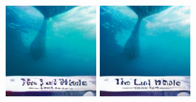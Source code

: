 \begin{figure}[h]
\begin{minipage}{0.15\textwidth}
    \end{minipage}
    \begin{minipage}{0.15\textwidth}
        \centering
        \includegraphics[width=\linewidth]{material/1k/2.png}
    \end{minipage}
    \begin{minipage}{0.15\textwidth}
        \centering
        \includegraphics[width=\linewidth]{material/8k/2.png}

\end{minipage}
\end{figure}
